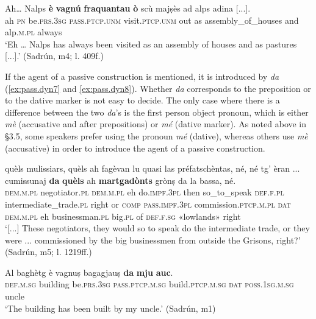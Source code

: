 \ea
\label{ex:pass.dyn6}
\gll Ah… Nalps \textbf{è} \textbf{vagnú} \textbf{fraquantau} \textbf{ò} scù majṣès ad alps adina [...].\\
ah  \textsc{pn}  be.\textsc{prs.3sg} \textsc{pass.ptcp.unm} visit.\textsc{ptcp.unm} out as assembly\_of\_houses and alp.\textsc{m.pl} always\\
\glt `Eh … Nalps has always been visited as an assembly of houses and as pastures [...].' (Sadrún, m4; l. 409f.)
\z

If the agent of a passive construction is mentioned, it is introduced by \textit{da} (\ref{ex:pass.dyn7} and \ref{ex:pass.dyn8}). Whether \textit{da} corresponds to the preposition or to the dative marker is not easy to decide. The only case where there is a difference between the two \textit{da}'s is the first person object pronoun, which is either \textit{mè} (accusative and after prepositions) or \textit{mé} (dative marker). As noted above in §3.5, some speakers prefer using the pronoun \textit{mé} (dative), whereas others use \textit{mè} (accusative) in order to introduce the agent of a passive construction.

\ea
\label{ex:pass.dyn7}
\gll [...] quèls mulissiars, quèls ah fagèvan lu quasi las préfatschèntas, né, né tg’ èran ... cumissunaj \textbf{da} \textbf{quèls} ah \textbf{martgadònts} grònṣ da la bassa, né.\\
{} \textsc{dem.m.pl} negotiator.\textsc{pl} \textsc{dem.m.pl} eh do.\textsc{impf.3pl} then so\_to\_speak \textsc{def.f.pl}  intermediate\_trade.\textsc{pl} right or \textsc{comp} \textsc{pass.impf.3pl} {} commission.\textsc{ptcp.m.pl} \textsc{dat} \textsc{dem.m.pl} eh businessman.\textsc{pl} big.\textsc{pl} of \textsc{def.f.sg} «lowlands» right \\
\glt `[...] These negotiators, they would so to speak do the intermediate trade, or they were ... commissioned by the big businessmen from outside the Grisons, right?' (Sadrún, m5; l. 1219ff.)
\z

\ea
\label{ex:pass.dyn8}
\gll Al baghètg è vagnuṣ bagagjauṣ \textbf{da} \textbf{mju} \textbf{auc}.\\
\textsc{def.m.sg} building be.\textsc{prs.3sg} \textsc{pass.ptcp.m.sg} build.\textsc{ptcp.m.sg} \textsc{dat} \textsc{poss.1sg.m.sg} uncle\\
\glt `The building has been built by my uncle.' (Sadrún, m1)
\z
